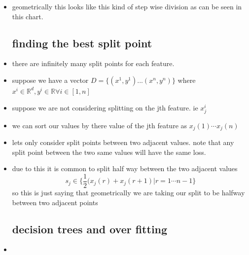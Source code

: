 \documentclass{article}
\begin{document}
\begin{itemize}
\item geometrically this looks like this kind of step wise division as can be seen in this chart. 
\subsection*{ finding the best split point}
\item there are infinitely many split points for each feature. 
\item suppose we have a vector $D=\{(x^1,y^1)...(x^n,y^n)\}$ where $x^i\in \mathbb{R}^{d}, y^i\in \mathbb{R}\forall i \in [1,n]$
\item suppose we are not considering splitting on the jth feature. ie $x^{i}_j$ 
\item we can sort our values by there value of the jth feature as $x_{j}(1)\cdots x_j(n)$
\item lets only consider split points between two adjacent values. note that any split point between the two same values will have the same loss.
\item due to this it is common to split half way between the two adjacent values $$s_j\in \{\frac{1}{2}(x_j(r)+x_{j}(r+1)|r=1\cdots n-1\}$$
so this is just saying that geometrically we are taking our split to be halfway between two adjacent points 
\subsection*{decision trees and over fitting}
\item 
\end{itemize}
\end{document}
